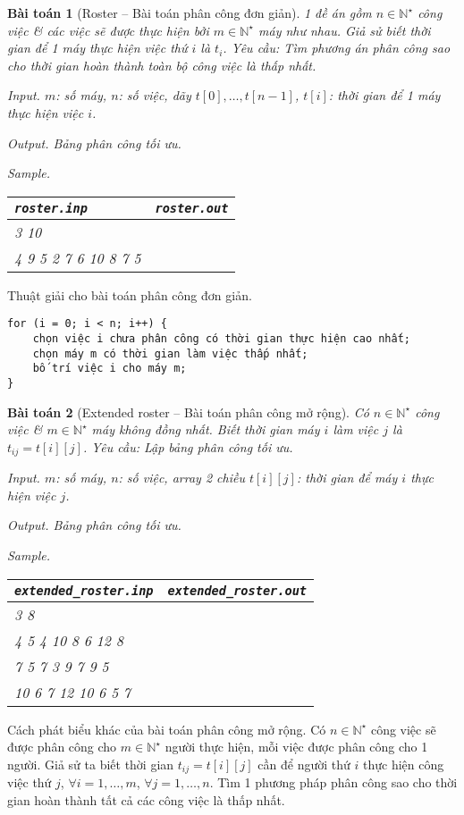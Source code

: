 \documentclass{article}
\newtheorem{baitoan}{Bài toán}
\begin{document}
\begin{baitoan}[Roster -- Bài toán phân công đơn giản]
	1 đề án gồm $n\in\mathbb{N}^\star$ công việc \& các việc sẽ được thực hiện bởi $m\in\mathbb{N}^\star$ máy như nhau. Giả sử biết thời gian để 1 máy thực hiện việc thứ $i$  là $t_i$. Yêu cầu: Tìm phương án phân công sao cho thời gian hoàn thành toàn bộ công việc là thấp nhất.
	\item {\sf Input.} $m$: số máy, $n$: số việc, dãy $t[0],\ldots,t[n-1]$, $t[i]$: thời gian để 1 máy thực hiện việc $i$.
	\item {\sf Output.} Bảng phân công tối ưu.
	\item {\sf Sample.}
	\begin{table}[H]
		\centering
		\begin{tabular}{|l|l|}
			\hline
			{\tt roster.inp} & {\tt roster.out} \\
			\hline
			3 10 &  \\
			4 9 5 2 7 6 10 8 7 5 &  \\
			\hline
		\end{tabular}
	\end{table}
\end{baitoan}
{\sf Thuật giải cho bài toán phân công đơn giản.}
\begin{verbatim}
for (i = 0; i < n; i++) {
    chọn việc i chưa phân công có thời gian thực hiện cao nhất;
    chọn máy m có thời gian làm việc thấp nhất;
    bố trí việc i cho máy m;
}
\end{verbatim}

\begin{baitoan}[Extended roster -- Bài toán phân công mở rộng]
	Có $n\in\mathbb{N}^\star$ công việc \& $m\in\mathbb{N}^\star$ máy không đồng nhất. Biết thời gian máy $i$ làm việc $j$ là $t_{ij} = t[i][j]$. Yêu cầu: Lập bảng phân công tối ưu.
	\item {\sf Input.} $m$: số máy, $n$: số việc, array 2 chiều $t[i][j]$: thời gian để máy $i$ thực hiện việc $j$.
	\item {\sf Output.} Bảng phân công tối ưu.
	\item {\sf Sample.}
	\begin{table}[H]
		\centering
		\begin{tabular}{|l|l|}
			\hline
			\verb|extended_roster.inp| & \verb|extended_roster.out| \\
			\hline
			3 8 &  \\
			4 5 4 10 8 6 12 8 &  \\
			7 5 7 3 9 7 9 5 &  \\
			10 6 7 12 10 6 5 7 &  \\
			\hline
		\end{tabular}
	\end{table}
\end{baitoan}
{\sf Cách phát biểu khác của bài toán phân công mở rộng.} Có $n\in\mathbb{N}^\star$ công việc sẽ được phân công cho $m\in\mathbb{N}^\star$ người thực hiện, mỗi việc được phân công cho 1 người. Giả sử ta biết thời gian $t_{ij} = t[i][j]$ cần để người thứ $i$ thực hiện công việc thứ $j$, $\forall i = 1,\ldots,m$, $\forall j = 1,\ldots,n$. Tìm 1 phương pháp phân công sao cho thời gian hoàn thành tất cả các công việc là thấp nhất.
\end{document}
